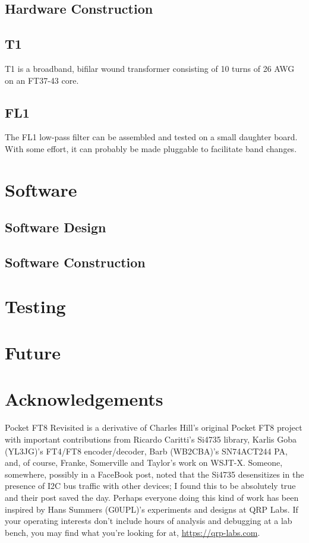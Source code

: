 \documentclass[10pt, letterpaper,]{article}
\begin{document}
 \subsection*{Hardware Construction}

\subsection*{T1}
T1 is a broadband, bifilar wound transformer consisting of 10 turns of 26 AWG on an FT37-43 core.

\subsection*{FL1}
The FL1 low-pass filter can be assembled and tested on a small daughter board.
With some effort, it can probably be made pluggable to facilitate band changes.

\section*{Software}
\subsection*{Software Design}

\subsection*{Software Construction}


\section*{Testing}

\section*{Future}

\section*{Acknowledgements}
Pocket FT8 Revisited is a derivative of Charles Hill's original Pocket FT8 project\cite{pocketFT8} with important contributions from Ricardo Caritti's Si4735 library, Karlis Goba (YL3JG)'s FT4/FT8 encoder/decoder, Barb (WB2CBA)'s SN74ACT244 PA, and, of course, Franke, Somerville and Taylor's work on WSJT-X\cite{qexFT8}.
Someone, somewhere, possibly in a FaceBook post, noted that the Si4735 desensitizes in the presence of I2C bus traffic with other devices; I found this to be absolutely true and their post saved the day.
Perhaps everyone doing this kind of work has been inspired by Hans Summers (G0UPL)'s experiments and designs at QRP Labs.  
If your operating interests don't include hours of analysis and debugging at a lab bench, you may find what you're looking for at, \url{https://qrp-labs.com}.
\end{document}

